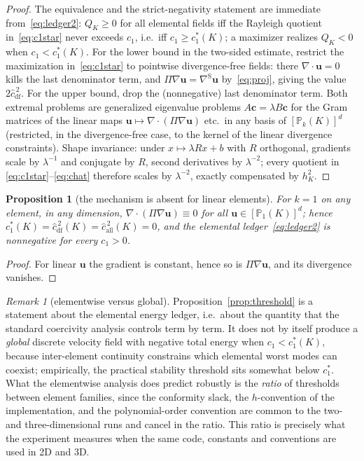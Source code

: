 \documentclass[11pt,a4paper]{article}
\newtheorem{proposition}{Proposition}
\theoremstyle{remark}
\newtheorem{remark}{Remark}
\newcommand{\PP}{\mathbb{P}}
\newcommand{\symgrad}{\nabla^{\mathrm{S}}}
\newcommand{\Proj}{\Pi}
\newcommand{\chat}{\hat{c}}
\begin{document}
\begin{proof}
The equivalence and the strict-negativity statement are immediate
from~\eqref{eq:ledger2}: $Q_K \ge 0$ for all elemental fields iff the
Rayleigh quotient in~\eqref{eq:c1star} never exceeds $c_1$, i.e.\ iff
$c_1 \ge c_1^*(K)$; a maximizer realizes $Q_K < 0$ when $c_1 <
c_1^*(K)$. For the lower bound in the two-sided estimate, restrict the
maximization in~\eqref{eq:c1star} to pointwise divergence-free fields:
there $\nabla\!\cdot\!\boldsymbol u = 0$ kills the last denominator
term, and $\Proj\nabla\boldsymbol u = \symgrad\boldsymbol u$
by~\eqref{eq:proj}, giving the value
$2\chat^{\,2}_{\mathrm{df}}$. For the upper bound, drop the
(nonnegative) last denominator term. Both extremal problems are
generalized eigenvalue problems $A\boldsymbol c = \lambda B\boldsymbol
c$ for the Gram matrices of the linear maps $\boldsymbol u \mapsto
\nabla\!\cdot(\Proj\nabla\boldsymbol u)$ etc.\ in any basis of
$[\PP_k(K)]^d$ (restricted, in the divergence-free case, to the
kernel of the linear divergence constraints). Shape invariance: under
$x \mapsto \lambda R x + b$ with $R$ orthogonal, gradients scale by
$\lambda^{-1}$ and conjugate by $R$, second derivatives by
$\lambda^{-2}$; every quotient in \eqref{eq:c1star}--\eqref{eq:chat}
therefore scales by $\lambda^{-2}$, exactly compensated by $h_K^2$.
\end{proof}

\begin{proposition}[the mechanism is absent for linear elements]
\label{prop:P1}
For $k = 1$ on any element, in any dimension,
$\nabla\!\cdot\!(\Proj\nabla\boldsymbol u) \equiv 0$ for all
$\boldsymbol u \in [\PP_1(K)]^d$; hence
$c_1^*(K) = \chat^{\,2}_{\mathrm{df}}(K) =
\chat^{\,2}_{\mathrm{all}}(K) = 0$, and the elemental
ledger~\eqref{eq:ledger2} is nonnegative for every $c_1 > 0$.
\end{proposition}

\begin{proof}
For linear $\boldsymbol u$ the gradient is constant, hence so is
$\Proj\nabla\boldsymbol u$, and its divergence vanishes.
\end{proof}

\begin{remark}[elementwise versus global]
\label{rem:global}
Proposition~\ref{prop:threshold} is a statement about the elemental
energy ledger, i.e.\ about the quantity that the standard coercivity
analysis controls term by term. It does not by itself produce a
\emph{global} discrete velocity field with negative total energy when
$c_1 < c_1^*(K)$, because inter-element continuity constrains which
elemental worst modes can coexist; empirically, the practical
stability threshold sits somewhat below $c_1^*$. What the elementwise
analysis does predict robustly is the \emph{ratio} of thresholds
between element families, since the conformity slack, the
$h$-convention of the implementation, and the polynomial-order
convention are common to the two- and three-dimensional runs and
cancel in the ratio. This ratio is precisely what the experiment
measures when the same code, constants and conventions are used in 2D
and 3D.
\end{remark}
\end{document}
